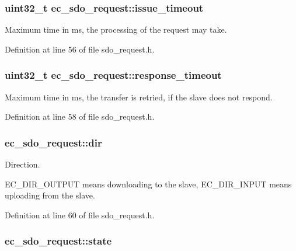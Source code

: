 \subsubsection[{issue\-\_\-timeout}]{\setlength{\rightskip}{0pt plus 5cm}uint32\-\_\-t ec\-\_\-sdo\-\_\-request\-::issue\-\_\-timeout}\label{structec__sdo__request_a042249b5e1776a0c0b6fc3003ef939a2}


Maximum time in ms, the processing of the request may take. 



Definition at line 56 of file sdo\-\_\-request.\-h.

\subsubsection[{response\-\_\-timeout}]{\setlength{\rightskip}{0pt plus 5cm}uint32\-\_\-t ec\-\_\-sdo\-\_\-request\-::response\-\_\-timeout}\label{structec__sdo__request_a0282ca505cf8acbbe9ecbbd1999967a9}


Maximum time in ms, the transfer is retried, if the slave does not respond. 



Definition at line 58 of file sdo\-\_\-request.\-h.

\subsubsection[{dir}]{ ec\-\_\-sdo\-\_\-request\-::dir}\label{structec__sdo__request_aaccb8ada520d7948b4f61653df6e871f}


Direction. 

E\-C\-\_\-\-D\-I\-R\-\_\-\-O\-U\-T\-P\-U\-T means downloading to the slave, E\-C\-\_\-\-D\-I\-R\-\_\-\-I\-N\-P\-U\-T means uploading from the slave. 

Definition at line 60 of file sdo\-\_\-request.\-h.

\subsubsection[{state}]{ ec\-\_\-sdo\-\_\-request\-::state}\label{structec__sdo__request_a0c50e10b80720d00f11863e76ecc1755}


